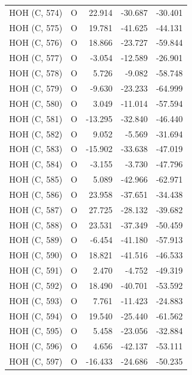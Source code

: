 \begin{longtable}{@{}lcrr@{}}
  \cmidrule(r){1-5}
  HOH (C, 574) & O & 22.914 & -30.687 & -30.401 \\
  \cmidrule(r){1-5}
  HOH (C, 575) & O & 19.781 & -41.625 & -44.131 \\
  \cmidrule(r){1-5}
  HOH (C, 576) & O & 18.866 & -23.727 & -59.844 \\
  \cmidrule(r){1-5}
  HOH (C, 577) & O & -3.054 & -12.589 & -26.901 \\
  \cmidrule(r){1-5}
  HOH (C, 578) & O & 5.726 & -9.082 & -58.748 \\
  \cmidrule(r){1-5}
  HOH (C, 579) & O & -9.630 & -23.233 & -64.999 \\
  \cmidrule(r){1-5}
  HOH (C, 580) & O & 3.049 & -11.014 & -57.594 \\
  \cmidrule(r){1-5}
  HOH (C, 581) & O & -13.295 & -32.840 & -46.440 \\
  \cmidrule(r){1-5}
  HOH (C, 582) & O & 9.052 & -5.569 & -31.694 \\
  \cmidrule(r){1-5}
  HOH (C, 583) & O & -15.902 & -33.638 & -47.019 \\
  \cmidrule(r){1-5}
  HOH (C, 584) & O & -3.155 & -3.730 & -47.796 \\
  \cmidrule(r){1-5}
  HOH (C, 585) & O & 5.089 & -42.966 & -62.971 \\
  \cmidrule(r){1-5}
  HOH (C, 586) & O & 23.958 & -37.651 & -34.438 \\
  \cmidrule(r){1-5}
  HOH (C, 587) & O & 27.725 & -28.132 & -39.682 \\
  \cmidrule(r){1-5}
  HOH (C, 588) & O & 23.531 & -37.349 & -50.459 \\
  \cmidrule(r){1-5}
  HOH (C, 589) & O & -6.454 & -41.180 & -57.913 \\
  \cmidrule(r){1-5}
  HOH (C, 590) & O & 18.821 & -41.516 & -46.533 \\
  \cmidrule(r){1-5}
  HOH (C, 591) & O & 2.470 & -4.752 & -49.319 \\
  \cmidrule(r){1-5}
  HOH (C, 592) & O & 18.490 & -40.701 & -53.592 \\
  \cmidrule(r){1-5}
  HOH (C, 593) & O & 7.761 & -11.423 & -24.883 \\
  \cmidrule(r){1-5}
  HOH (C, 594) & O & 19.540 & -25.440 & -61.562 \\
  \cmidrule(r){1-5}
  HOH (C, 595) & O & 5.458 & -23.056 & -32.884 \\
  \cmidrule(r){1-5}
  HOH (C, 596) & O & 4.656 & -42.137 & -53.111 \\
  \cmidrule(r){1-5}
  HOH (C, 597) & O & -16.433 & -24.686 & -50.235 \\

\end{longtable}
